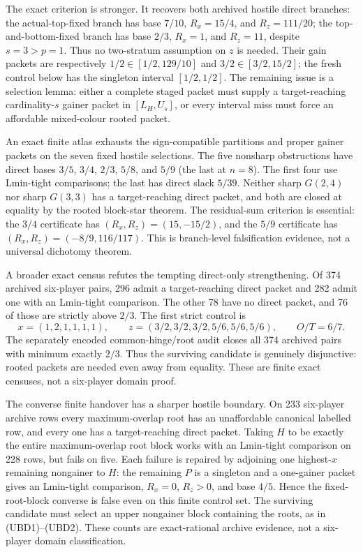 \documentclass[11pt]{article}
\begin{document}
The exact criterion is stronger.  It recovers both archived hostile direct
branches: the actual-top-fixed branch has base $7/10$, $R_x=15/4$, and
$R_z=111/20$; the top-and-bottom-fixed branch has base $2/3$, $R_x=1$, and
$R_z=11$, despite $s=3>p=1$.  Thus no two-stratum assumption on $z$ is
needed.  Their gain packets are respectively $1/2\in[1/2,129/10]$ and
$3/2\in[3/2,15/2]$; the fresh control below has the singleton interval
$[1/2,1/2]$.  The remaining issue is a selection lemma: either a complete staged
packet must supply a target-reaching cardinality-$s$ gainer packet in
$[L_H,U_s]$, or every interval miss must force an affordable mixed-colour
rooted packet.

An exact finite atlas exhausts the sign-compatible partitions and proper
gainer packets on the seven fixed hostile selections.  The five nonsharp
obstructions have direct bases $3/5$, $3/4$, $2/3$, $5/8$, and $5/9$ (the
last at $n=8$).  The first four use Lmin-tight comparisons; the last has
direct slack $5/39$.  Neither sharp $G(2,4)$ nor sharp $G(3,3)$ has a
target-reaching direct packet, and both are closed at equality by the rooted
block-star theorem.  The residual-sum criterion is essential: the $3/4$
certificate has $(R_x,R_z)=(15,-15/2)$, and the $5/9$ certificate has
$(R_x,R_z)=(-8/9,116/117)$.  This is branch-level falsification evidence,
not a universal dichotomy theorem.

A broader exact census refutes the tempting direct-only strengthening.  Of
374 archived six-player pairs, 296 admit a target-reaching direct packet and
282 admit one with an Lmin-tight comparison.  The other 78 have no direct
packet, and 76 of those are strictly above $2/3$.  The first strict control is
\[
 x=(1,2,1,1,1,1),\qquad
 z=(3/2,3/2,3/2,5/6,5/6,5/6),\qquad O/T=6/7.
\]
The separately encoded common-hinge/root audit closes all 374 archived pairs
with minimum exactly $2/3$.  Thus the surviving candidate is genuinely
disjunctive: rooted packets are needed even away from equality.  These are
finite exact censuses, not a six-player domain proof.

The converse finite handover has a sharper hostile boundary.  On 233
six-player archive rows every maximum-overlap root has an unaffordable
canonical labelled row, and every one has a target-reaching direct packet.
Taking $H$ to be exactly the entire maximum-overlap root block works with an
Lmin-tight comparison on 228 rows, but fails on five.  Each failure is
repaired by adjoining one highest-$x$ remaining nongainer to $H$: the
remaining $P$ is a singleton and a one-gainer packet gives an Lmin-tight
comparison, $R_x=0$, $R_z>0$, and base $4/5$.  Hence the fixed-root-block
converse is false even on this finite control set.  The surviving candidate
must select an upper nongainer block containing the roots, as in
(UBD1)--(UBD2).  These counts are exact-rational archive evidence, not a
six-player domain classification.
\end{document}
